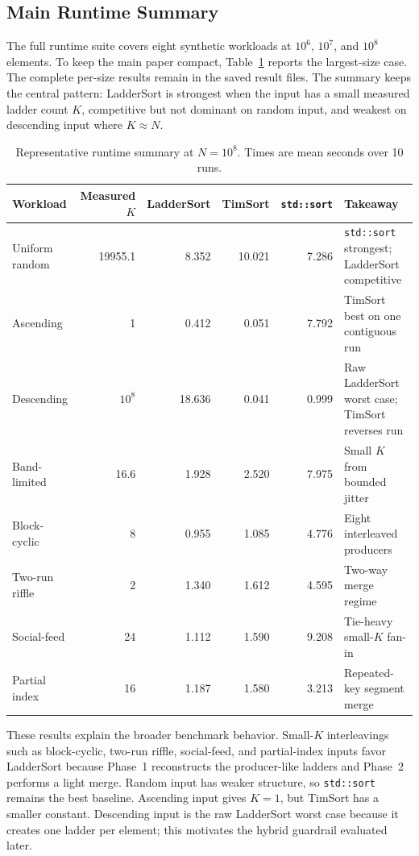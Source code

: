 \documentclass[10pt]{article}
\begin{document}
\subsection{Main Runtime Summary}
\label{main-runtime-summary}

The full runtime suite covers eight synthetic workloads at \(10^6\), \(10^7\),
and \(10^8\) elements. To keep the main paper compact,
Table~\ref{tab:runtime-summary-100m} reports the largest-size case. The
complete per-size results remain in the saved result files. The summary keeps
the central pattern: LadderSort is strongest when the input has a small
measured ladder count \(K\), competitive but not dominant on random input, and
weakest on descending input where \(K\approx N\).

\begin{table}[H]
\centering
\scriptsize
\caption{Representative runtime summary at \(N=10^8\). Times are mean seconds over 10 runs.}
\label{tab:runtime-summary-100m}
\begin{tabularx}{\linewidth}{@{}l r r r r X@{}}
\toprule
Workload & Measured \(K\) & LadderSort & TimSort & \texttt{std::sort} & Takeaway \\
\midrule
Uniform random & 19955.1 & 8.352 & 10.021 & 7.286 & \texttt{std::sort} strongest; LadderSort competitive \\
Ascending & 1 & 0.412 & 0.051 & 7.792 & TimSort best on one contiguous run \\
Descending & \(10^8\) & 18.636 & 0.041 & 0.999 & Raw LadderSort worst case; TimSort reverses run \\
Band-limited & 16.6 & 1.928 & 2.520 & 7.975 & Small \(K\) from bounded jitter \\
Block-cyclic & 8 & 0.955 & 1.085 & 4.776 & Eight interleaved producers \\
Two-run riffle & 2 & 1.340 & 1.612 & 4.595 & Two-way merge regime \\
Social-feed & 24 & 1.112 & 1.590 & 9.208 & Tie-heavy small-\(K\) fan-in \\
Partial index & 16 & 1.187 & 1.580 & 3.213 & Repeated-key segment merge \\
\bottomrule
\end{tabularx}
\end{table}

These results explain the broader benchmark behavior. Small-\(K\) interleavings
such as block-cyclic, two-run riffle, social-feed, and partial-index inputs
favor LadderSort because Phase~1 reconstructs the producer-like ladders and
Phase~2 performs a light merge. Random input has weaker structure, so
\texttt{std::sort} remains the best baseline. Ascending input gives \(K=1\),
but TimSort has a smaller constant. Descending input is the raw LadderSort worst
case because it creates one ladder per element; this motivates the hybrid
guardrail evaluated later.
\end{document}
